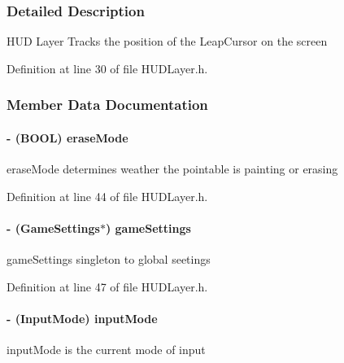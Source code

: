 \subsubsection{Detailed Description}
H\-U\-D Layer Tracks the position of the Leap\-Cursor on the screen 

Definition at line 30 of file H\-U\-D\-Layer.\-h.



\subsubsection{Member Data Documentation}
\hypertarget{interface_h_u_d_layer_aa1df984387a5f884acf38a7d733d6432}{
\paragraph[{erase\-Mode}]{\setlength{\rightskip}{0pt plus 5cm}-\/ (B\-O\-O\-L) erase\-Mode\hspace{0.3cm}{\ttfamily [protected]}}}\label{d3/d8a/interface_h_u_d_layer_aa1df984387a5f884acf38a7d733d6432}
erase\-Mode determines weather the pointable is painting or erasing 

Definition at line 44 of file H\-U\-D\-Layer.\-h.

\hypertarget{interface_h_u_d_layer_a69515b3bf7bddc07e65bad3eaa4a2e7a}{
\paragraph[{game\-Settings}]{\setlength{\rightskip}{0pt plus 5cm}-\/ ({\bf Game\-Settings}$\ast$) game\-Settings\hspace{0.3cm}{\ttfamily [protected]}}}\label{d3/d8a/interface_h_u_d_layer_a69515b3bf7bddc07e65bad3eaa4a2e7a}
game\-Settings singleton to global seetings 

Definition at line 47 of file H\-U\-D\-Layer.\-h.

\hypertarget{interface_h_u_d_layer_a1e506792d581032644d75804beb359a7}{
\paragraph[{input\-Mode}]{\setlength{\rightskip}{0pt plus 5cm}-\/ (Input\-Mode) input\-Mode\hspace{0.3cm}{\ttfamily [protected]}}}\label{d3/d8a/interface_h_u_d_layer_a1e506792d581032644d75804beb359a7}
input\-Mode is the current mode of input 

